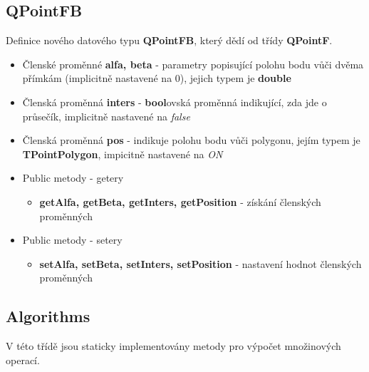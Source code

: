 \documentclass[a4paper, 12pt]{article}
\begin{document}
\subsection{QPointFB}
Definice nového datového typu \textbf{QPointFB}, který dědí od třídy \textbf{QPointF}.
\begin{itemize}
	\item	Členské proměnné \textbf{alfa, beta} - parametry popisující polohu bodu vůči dvěma přímkám (implicitně nastavené na 0), jejich typem je \textbf{double}
	\item Členská proměnná \textbf{inters} - \textbf{bool}ovská proměnná indikující, zda jde o průsečík, implicitně nastavené na \textit{false}
	\item Členská proměnná \textbf{pos} - indikuje polohu bodu vůči polygonu, jejím typem je \textbf{TPointPolygon}, impicitně nastavené na \textit{ON}
	\item Public metody - getery
	\begin{itemize}
		\item \textbf{getAlfa, getBeta, getInters, getPosition} - získání členských proměnných
	\end{itemize}
	\item Public metody - setery
	\begin{itemize}
		\item \textbf{setAlfa, setBeta, setInters, setPosition} - nastavení hodnot členských proměnných
	\end{itemize}
\end{itemize}

\subsection{Algorithms}
V této třídě jsou staticky implementovány metody pro výpočet množinových operací. 
\end{document}

